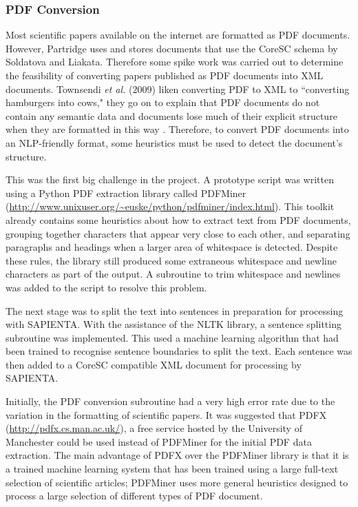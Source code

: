 \subsubsection{PDF Conversion}
Most scientific papers available on the internet are formatted as PDF
documents. However, Partridge uses and stores documents that use the CoreSC
schema by Soldatova and Liakata\cite{liakata2008guidelines}. Therefore some
spike work was carried out to determine the feasibility of converting papers
published as PDF documents into XML documents. Townsendi \emph{et al.} (2009) liken converting
PDF to XML to ``converting hamburgers into cows," they go on to explain that
PDF documents do not contain any semantic data and documents lose much of their
explicit structure when they are formatted in this way \cite{Townsend2009}.
Therefore, to convert PDF documents into an NLP-friendly format, some
heuristics must be used to detect the document's structure\cite{pdfminer}.

This was the first big challenge in the project. A prototype script was written
using a Python PDF extraction library called PDFMiner
(\url{http://www.unixuser.org/~euske/python/pdfminer/index.html}).  This
toolkit already contains some heuristics about how to extract text from PDF
documents, grouping together characters that appear very close to each other,
and separating paragraphs and headings when a larger area of whitespace is
detected\cite{pdfminer}. Despite these rules, the library still produced some
extraneous whitespace and newline characters as part of the output. A
subroutine to trim whitespace and newlines was added to the script to resolve
this problem. 

The next stage was to split the text into sentences in preparation for
processing with SAPIENTA. With the assistance of the NLTK library, a sentence
splitting subroutine was implemented. This used a machine learning algorithm
that had been trained to recognise sentence boundaries to split the text. Each
sentence was then added to a CoreSC compatible XML document for processing by
SAPIENTA.

Initially, the PDF conversion subroutine had a very high error rate due to the
variation in the formatting of scientific papers. It was suggested that PDFX
(\url{http://pdfx.cs.man.ac.uk/}), a free service hosted by the University of
Manchester could be used instead of PDFMiner for the initial PDF data
extraction. The main advantage of PDFX over the PDFMiner library is that it is a
trained machine learning system that has been trained using a large full-text
selection of scientific articles; PDFMiner uses more general heuristics
designed to process a large selection of different types of PDF document.

